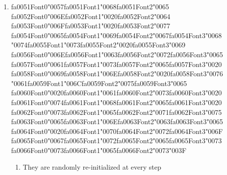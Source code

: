 \documentclass[12pt]{article}
\begin{document}
\begin{enumerate}[label=Q\arabic*.]
\item {\csname fa0051Font0\endcsname\char"0057}{\csname fa0051Font1\endcsname\char"0068}{\csname fa0051Font2\endcsname\char"0065} {\csname fa0052Font0\endcsname\char"006E}{\csname fa0052Font1\endcsname\char"0020}{\csname fa0052Font2\endcsname\char"0064} {\csname fa0053Font0\endcsname\char"006F}{\csname fa0053Font1\endcsname\char"0020}{\csname fa0053Font2\endcsname\char"0077} {\csname fa0054Font0\endcsname\char"0065}{\csname fa0054Font1\endcsname\char"0069}{\csname fa0054Font2\endcsname\char"0067}{\csname fa0054Font3\endcsname\char"0068} {\char"0074}{\csname fa0055Font1\endcsname\char"0073}{\csname fa0055Font2\endcsname\char"0020}{\csname fa0055Font3\endcsname\char"0069} {\csname fa0056Font0\endcsname\char"006E}{\csname fa0056Font1\endcsname\char"0063}{\csname fa0056Font2\endcsname\char"0072}{\csname fa0056Font3\endcsname\char"0065} {\csname fa0057Font0\endcsname\char"0061}{\csname fa0057Font1\endcsname\char"0073}{\csname fa0057Font2\endcsname\char"0065}{\csname fa0057Font3\endcsname\char"0020} {\csname fa0058Font0\endcsname\char"0069}{\csname fa0058Font1\endcsname\char"006E}{\csname fa0058Font2\endcsname\char"0020}{\csname fa0058Font3\endcsname\char"0076} {\char"0061}{\csname fa0059Font1\endcsname\char"006C}{\csname fa0059Font2\endcsname\char"0075}{\csname fa0059Font3\endcsname\char"0065} {\csname fa0060Font0\endcsname\char"0020}{\csname fa0060Font1\endcsname\char"0061}{\csname fa0060Font2\endcsname\char"0073}{\csname fa0060Font3\endcsname\char"0020} {\csname fa0061Font0\endcsname\char"0074}{\csname fa0061Font1\endcsname\char"0068}{\csname fa0061Font2\endcsname\char"0065}{\csname fa0061Font3\endcsname\char"0020} {\csname fa0062Font0\endcsname\char"0073}{\csname fa0062Font1\endcsname\char"0065}{\csname fa0062Font2\endcsname\char"0071}{\csname fa0062Font3\endcsname\char"0075} {\csname fa0063Font0\endcsname\char"0065}{\csname fa0063Font1\endcsname\char"006E}{\csname fa0063Font2\endcsname\char"0063}{\csname fa0063Font3\endcsname\char"0065} {\csname fa0064Font0\endcsname\char"0020}{\csname fa0064Font1\endcsname\char"0070}{\csname fa0064Font2\endcsname\char"0072}{\csname fa0064Font3\endcsname\char"006F} {\csname fa0065Font0\endcsname\char"0067}{\csname fa0065Font1\endcsname\char"0072}{\csname fa0065Font2\endcsname\char"0065}{\csname fa0065Font3\endcsname\char"0073} {\csname fa0066Font0\endcsname\char"0073}{\csname fa0066Font1\endcsname\char"0065}{\csname fa0066Font2\endcsname\char"0073}{\char"003F}
\begin{enumerate}[label=(\Alph*)]
    \item They are randomly re-initialized at every step

\end{enumerate}
\end{enumerate}
\end{document}
